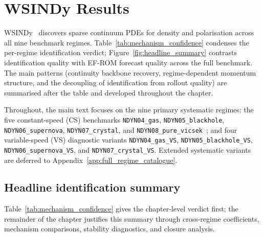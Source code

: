 \chapter{WSINDy Results}
\label{ch:wsindy_results}

WSINDy~\cite{messenger2021wsindy} discovers sparse continuum PDEs for density and polarisation
across all nine benchmark regimes.
Table~\ref{tab:mechanism_confidence} condenses the per-regime identification
verdict; Figure~\ref{fig:headline_summary} contrasts identification quality
with EF-ROM forecast quality across the full benchmark.
The main patterns (continuity backbone recovery, regime-dependent momentum
structure, and the decoupling of identification from rollout
quality) are summarised after the table and developed throughout the
chapter.

Throughout, the main text focuses on the nine primary systematic regimes:
the five constant-speed (CS) benchmarks
\texttt{NDYN04\_gas},
\texttt{NDYN05\_blackhole},
\texttt{NDYN06\_supernova},
\texttt{NDYN07\_crystal},
and \texttt{NDYN08\_pure\_vicsek}~\cite{vicsek1995vicsek};
and four variable-speed (VS) diagnostic variants
\texttt{NDYN04\_gas\_VS},
\texttt{NDYN05\_blackhole\_VS},
\texttt{NDYN06\_supernova\_VS},
and \texttt{NDYN07\_crystal\_VS}.
Extended systematic variants are
deferred to Appendix~\ref{app:full_regime_catalogue}.

\section{Headline identification summary}
\label{sec:wsindy_headline}

Table~\ref{tab:mechanism_confidence} gives the chapter-level verdict
first; the remainder of the chapter justifies this summary through
cross-regime coefficients, mechanism comparisons, stability diagnostics,
and closure analysis.

